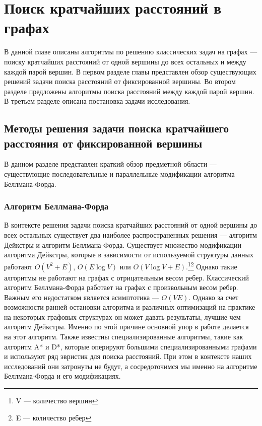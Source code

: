 \chapter{Поиск кратчайших расстояний в графах}
\label{chapSVD}

В данной главе описаны алгоритмы по решению классических задач на графах --- поиску кратчайших расстояний от одной вершины до всех остальных и между каждой парой вершин. В первом разделе главы представлен обзор существующих решений задачи поиска расстояний от фиксированной вершины. Во втором разделе предложены алгоритмы поиска расстояний между каждой парой вершин. В третьем разделе описана постановка задачи исследования.

\FloatBarrier
\section{Методы решения задачи поиска кратчайшего расстояния от фиксированной вершины}

В данном разделе представлен краткий обзор предметной области --- существующие последовательные и параллельные модификации алгоритма Беллмана-Форда.

\FloatBarrier
\subsection{Алгоритм Беллмана-Форда}

В контексте решения задачи поиска кратчайших расстояний от одной вершины до всех остальных существует два наиболее распространенных решения --- алгоритм Дейкстры и алгоритм Беллмана-Форда. Существует множество модификации алгоритма Дейкстры, которые в зависимости от используемой структуры данных работают $O(V^2+E)$, $O(E \log V)$ или $O(V \log V+E)$.\footnote{V --- количество вершин}\footnote{E --- количество ребер} Однако такие алгоритмы не работают на графах с отрицательным весом ребер. Классический алгоритм Беллмана-Форда работает на графах с произвольным весом ребер. Важным его недостатком является асимптотика --- $O(VE)$. Однако за счет возможности ранней остановки алгоритма и различных оптимизаций на практике на некоторых графовых структурах он может давать результаты, лучшие чем алгоритм Дейкстры. Именно по этой причине основной упор в работе делается на этот алгоритм. Также известны специализированные алгоритмы, такие как алгоритм A* и D*, которые оперируют большими специализированными графами и используют ряд эвристик для поиска расстояний. При этом в контексте наших исследований они затронуты не будут, а сосредоточимся мы именно на алгоритме Беллмана-Форда и его модификациях.   


